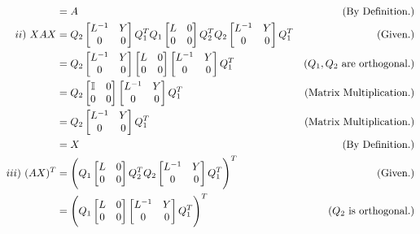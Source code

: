 \begin{solution}
\begin{align}
        &= A &\text{(By Definition.)}\nonumber\\
        ii) \ XAX &= Q_2\begin{bmatrix}L^\inv &Y \\ 0 &0\end{bmatrix}Q_1^T Q_1 \begin{bmatrix}L &0\\0&0\end{bmatrix}Q_2^T Q_2\begin{bmatrix}L^\inv &Y \\ 0 &0\end{bmatrix}Q_1^T &\text{(Given.)}\nonumber\\
        &= Q_2\begin{bmatrix}L^\inv &Y \\ 0 &0\end{bmatrix} \begin{bmatrix}L &0\\0&0\end{bmatrix}\begin{bmatrix}L^\inv &Y \\ 0 &0\end{bmatrix}Q_1^T &\text{($Q_1, Q_2$ are orthogonal.)}\nonumber\\
        &= Q_2\begin{bmatrix}\id &0\\0 &0\end{bmatrix}\begin{bmatrix}L^\inv &Y \\0 &0\end{bmatrix}Q_1^T &\text{(Matrix Multiplication.)}\nonumber\\
        &= Q_2\begin{bmatrix}L^\inv &Y \\0 &0\end{bmatrix}Q_1^T&\text{(Matrix Multiplication.)}\nonumber\\
        &= X &\text{(By Definition.)}\nonumber\\
        iii) \ (AX)^T &= \Bigg(Q_1 \begin{bmatrix}L &0\\0&0\end{bmatrix}Q_2^T Q_2\begin{bmatrix}L^\inv &Y \\ 0 &0\end{bmatrix}Q_1^T \Bigg)^T &\text{(Given.)}\nonumber\\
        &= \Bigg(Q_1 \begin{bmatrix}L &0\\0&0\end{bmatrix}\begin{bmatrix}L^\inv &Y \\ 0 &0\end{bmatrix}Q_1^T \Bigg)^T &\text{($Q_2$ is orthogonal.)}\nonumber\\

\end{align}
\end{solution}
